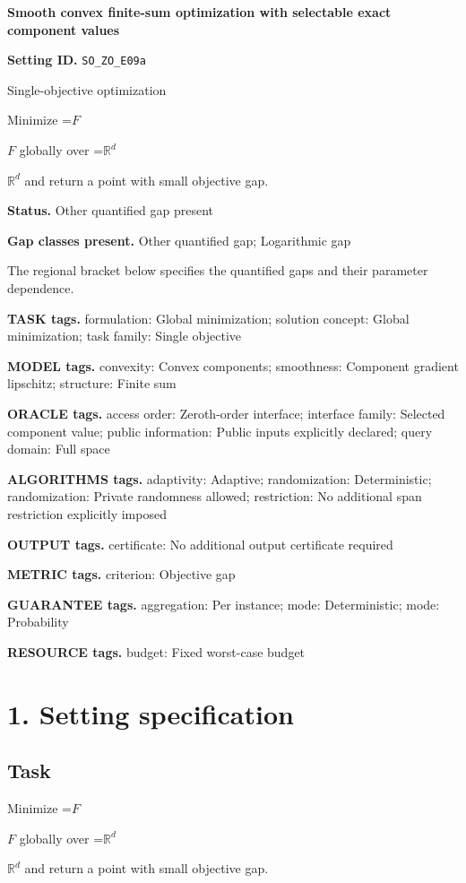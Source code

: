 \documentclass[10pt,a4paper]{article}
\newcommand{\AtlasMath}[1]{\par\begingroup\centering\setbox0=\hbox{$\displaystyle #1$}\ifdim\wd0>1.4\linewidth\typeout{ATLAS WIDE FORMULA: \the\wd0}\fi\ifdim\wd0>\linewidth\resizebox{\linewidth}{!}{\box0}\else\box0\fi\par\endgroup}
\newcommand{\AtlasInlineMath}[1]{\begingroup\setbox0=\hbox{$#1$}\ifdim\wd0>.4\linewidth\endgroup\AtlasMath{#1}\else\endgroup$#1$\fi}
\begin{document}
\raggedright

{\LARGE\bfseries\sffamily\color{AtlasNavy} Smooth convex finite-sum optimization with selectable exact component values\par}\vspace{5pt}
\textbf{Setting ID.} \texttt{SO\_\allowbreak{}ZO\_\allowbreak{}E09a}

Single-objective optimization

Minimize \AtlasInlineMath{F} globally over \AtlasInlineMath{\mathbb{R}^d} and return a point with small objective gap.

\textbf{Status.} Other quantified gap present

\textbf{Gap classes present.} Other quantified gap; Logarithmic gap

The regional bracket below specifies the quantified gaps and their parameter dependence.

\textbf{TASK tags.} formulation: Global minimization; solution concept: Global minimization; task family: Single objective

\textbf{MODEL tags.} convexity: Convex components; smoothness: Component gradient lipschitz; structure: Finite sum

\textbf{ORACLE tags.} access order: Zeroth-order interface; interface family: Selected component value; public information: Public inputs explicitly declared; query domain: Full space

\textbf{ALGORITHMS tags.} adaptivity: Adaptive; randomization: Deterministic; randomization: Private randomness allowed; restriction: No additional span restriction explicitly imposed

\textbf{OUTPUT tags.} certificate: No additional output certificate required

\textbf{METRIC tags.} criterion: Objective gap

\textbf{GUARANTEE tags.} aggregation: Per instance; mode: Deterministic; mode: Probability

\textbf{RESOURCE tags.} budget: Fixed worst-case budget

\section{1. Setting specification}
\subsection{Task}
Minimize \AtlasInlineMath{F} globally over \AtlasInlineMath{\mathbb{R}^d} and return a point with small objective gap.
\end{document}
